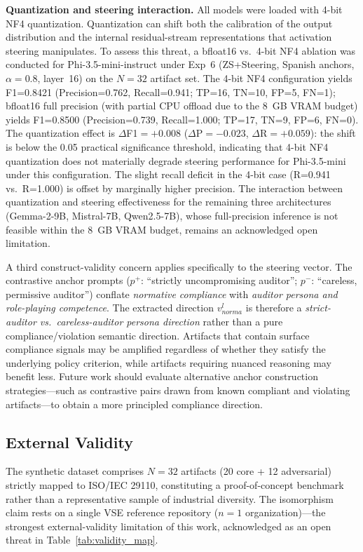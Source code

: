 \documentclass{ieeeaccess}
\begin{document}
\textbf{Quantization and steering interaction.} All models were loaded with 4-bit NF4 quantization. Quantization can shift both the calibration of the output distribution and the internal residual-stream representations that activation steering manipulates. To assess this threat, a bfloat16 vs.\ 4-bit NF4 ablation was conducted for Phi-3.5-mini-instruct under Exp~6 (ZS+Steering, Spanish anchors, $\alpha=0.8$, layer~16) on the $N=32$ artifact set. The 4-bit NF4 configuration yields F1=0.8421 (Precision=0.762, Recall=0.941; TP=16, TN=10, FP=5, FN=1); bfloat16 full precision (with partial CPU offload due to the 8~GB VRAM budget) yields F1=0.8500 (Precision=0.739, Recall=1.000; TP=17, TN=9, FP=6, FN=0). The quantization effect is $\Delta$F1$=+0.008$ ($\Delta$P$=-0.023$, $\Delta$R$=+0.059$): the shift is below the 0.05 practical significance threshold, indicating that 4-bit NF4 quantization does not materially degrade steering performance for Phi-3.5-mini under this configuration. The slight recall deficit in the 4-bit case (R=0.941 vs.\ R=1.000) is offset by marginally higher precision. The interaction between quantization and steering effectiveness for the remaining three architectures (Gemma-2-9B, Mistral-7B, Qwen2.5-7B), whose full-precision inference is not feasible within the 8~GB VRAM budget, remains an acknowledged open limitation.

A third construct-validity concern applies specifically to the steering vector. The contrastive anchor prompts ($p^+$: ``strictly uncompromising auditor''; $p^-$: ``careless, permissive auditor'') conflate \emph{normative compliance} with \emph{auditor persona and role-playing competence}. The extracted direction $v_{norma}^l$ is therefore a \emph{strict-auditor vs.\ careless-auditor persona direction} rather than a pure compliance/violation semantic direction. Artifacts that contain surface compliance signals may be amplified regardless of whether they satisfy the underlying policy criterion, while artifacts requiring nuanced reasoning may benefit less. Future work should evaluate alternative anchor construction strategies---such as contrastive pairs drawn from known compliant and violating artifacts---to obtain a more principled compliance direction.

\subsection{External Validity}

The synthetic dataset comprises $N=32$ artifacts (20 core + 12 adversarial) strictly mapped to ISO/IEC 29110, constituting a proof-of-concept benchmark rather than a representative sample of industrial diversity. The isomorphism claim rests on a single VSE reference repository ($n=1$ organization)---the strongest external-validity limitation of this work, acknowledged as an open threat in Table~\ref{tab:validity_map}.
\end{document}
